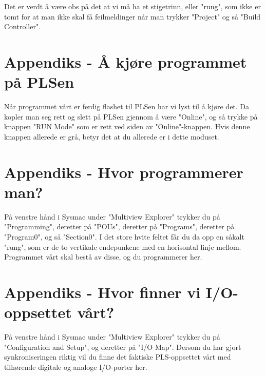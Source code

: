 Det er verdt å være obs på det at vi må ha et stigetrinn, eller "rung", som ikke er tomt for at man ikke skal få feilmeldinger når man trykker "Project" og så "Build Controller".\\

\section{Appendiks - Å kjøre programmet på PLSen}
Når programmet vårt er ferdig flashet til PLSen har vi lyst til å kjøre det. Da kopler man seg rett og slett på PLSen gjennom å være "Online", og så trykke på knappen "RUN Mode" som er rett ved siden av "Online"-knappen. Hvis denne knappen allerede er grå, betyr det at du allerede er i dette moduset.

\section{Appendiks - Hvor programmerer man?}
På venstre hånd i Sysmac under "Multiview Explorer" trykker du på "Programming", deretter på "POUs", deretter på "Programs", deretter på "Program0", og så "Section0". I det store hvite feltet får du da opp en såkalt "rung", som er de to vertikale endepunkene med en horisontal linje mellom. Programmet vårt skal bestå av disse, og du programmerer her.

\section{Appendiks - Hvor finner vi I/O-oppsettet vårt?}
På venstre hånd i Sysmac under "Multiview Explorer" trykker du på "Configuration and Setup", og deretter på "I/O Map". Dersom du har gjort synkroniseringen riktig vil du finne det faktiske PLS-oppsettet vårt med tilhørende digitale og analoge I/O-porter her.